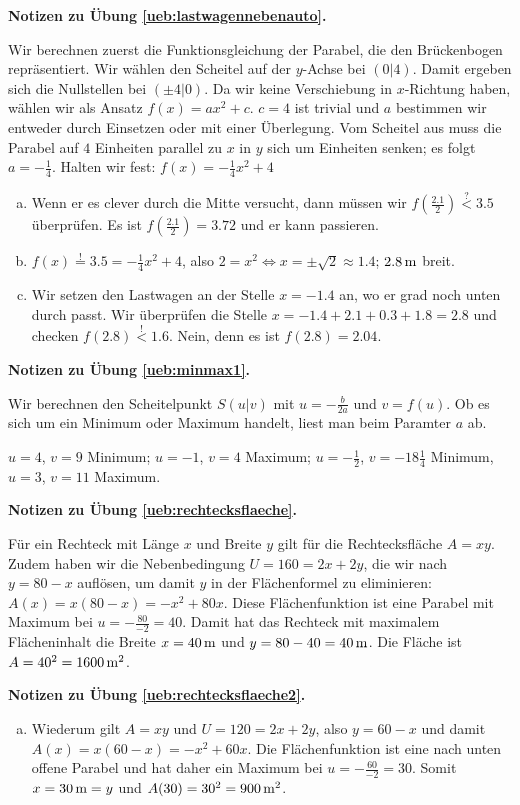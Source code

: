 \documentclass[%
11pt,%
twoside,%
titlepage,%
german,%
headsepline%
]{scrartcl}
\newcommand{\concatueb}[1]{ueb:#1}%
\newcommand{\concatlsg}[1]{lsg:#1}%
\newenvironment{lsg}[1]{%
    \par\noindent\textbf{Notizen zu Übung \ref{\concatueb{#1}}.}%
    \label{\concatlsg{#1}}
}{%
    \par%
}
\begin{document}
\begin{lsg}{lastwagennebenauto}
    Wir berechnen zuerst die Funktionsgleichung der Parabel, die den Brückenbogen repräsentiert. Wir wählen den Scheitel auf der $y$-Achse bei $(0|4)$. Damit ergeben sich die Nullstellen bei $(\pm4|0)$. Da wir keine Verschiebung in $x$-Richtung haben, wählen wir als Ansatz $f(x)=ax^2+c$. $c=4$ ist trivial und $a$ bestimmen wir entweder durch Einsetzen oder mit einer Überlegung. Vom Scheitel aus muss die Parabel auf $4$ Einheiten parallel zu $x$ in $y$ sich um Einheiten senken; es folgt $a=-\frac{1}{4}$. Halten wir fest: $f(x)=-\frac{1}{4}x^2+4$

    \begin{enumerate}[a)]
        \item Wenn er es clever durch die Mitte versucht, dann müssen wir $f(\frac{2.1}{2})\stackrel{?}{<}3.5$ überprüfen. Es ist $f(\frac{2.1}{2})=3.72$ und er kann passieren.
        \item $f(x)\stackrel{!}{=}3.5=-\frac{1}{4}x^2+4$, also $2=x^2\Leftrightarrow x=\pm\sqrt{2}\approx1.4$; $\unit[2.8]{m}$ breit.
        \item Wir setzen den Lastwagen an der Stelle $x=-1.4$ an, wo er grad noch unten durch passt. Wir überprüfen die Stelle $x=-1.4+2.1+0.3+1.8=2.8$ und checken $f(2.8)\stackrel{!}{<}1.6$. Nein, denn es ist $f(2.8)=2.04$.
    \end{enumerate}
\end{lsg}
\begin{lsg}{minmax1}
    Wir berechnen den Scheitelpunkt $S(u|v)$ mit $u=-\frac{b}{2a}$ und $v=f(u)$. Ob es sich um ein Minimum oder Maximum handelt, liest man beim Paramter $a$ ab.
    
    $u=4$, $v=9$ Minimum; $u=-1$, $v=4$ Maximum; $u=-\frac{1}{2}$, $v=-18\frac{1}{4}$ Minimum, $u=3$, $v=11$ Maximum.
\end{lsg}
\begin{lsg}{rechtecksflaeche}
    Für ein Rechteck mit Länge $x$ und Breite $y$ gilt für die Rechtecksfläche $A=xy$. Zudem haben wir die Nebenbedingung $U=160=2x+2y$, die wir nach $y=80-x$ auflösen, um damit $y$ in der Flächenformel zu eliminieren: $A(x)=x(80-x)=-x^2+80x$. Diese Flächenfunktion ist eine Parabel mit Maximum bei $u=-\frac{80}{-2}=40$. Damit hat das Rechteck mit maximalem Flächeninhalt die Breite $x=\unit[40]{m}$ und $y=80-40=\unit[40]{m}$. Die Fläche ist $A=40^2=\unit[1600]{m^2}$.
\end{lsg}
\begin{lsg}{rechtecksflaeche2}
    \begin{enumerate}[a)]
        \item Wiederum gilt $A=xy$ und $U=120=2x+2y$, also $y=60-x$ und damit $A(x)=x(60-x)=-x^2+60x$. Die Flächenfunktion ist eine nach unten offene Parabel und hat daher ein Maximum bei $u=-\frac{60}{-2}=30$. Somit $x=\unit[30]{m}=y$ und $A(30)=30^2=\unit[900]{m^2}$.
    \end{enumerate}
\end{lsg}
\end{document}
